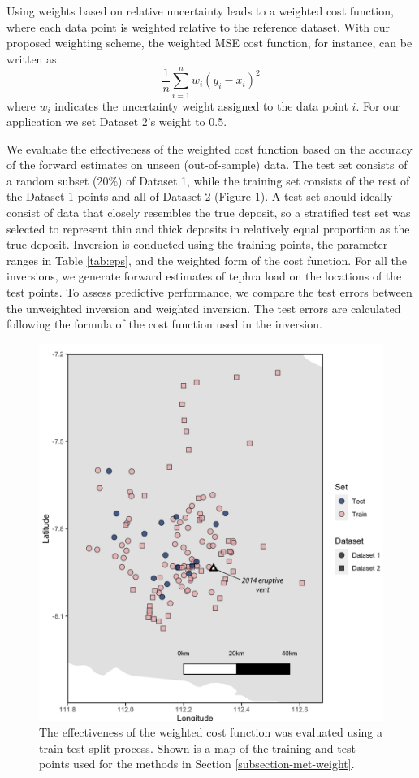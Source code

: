 \documentclass[a4paper,fleqn]{cas-sc}
\begin{document}
Using weights based on relative uncertainty leads to a weighted cost function, where each data point is weighted relative to the reference dataset. With our proposed weighting scheme, the weighted MSE cost function, for instance, can be written as:
\begin{equation}
\frac{1}{n} \sum_{i=1}^{n} w_{i} (y_{i} - x_{i})^{2}
\end{equation}
where $w_{i}$ indicates the uncertainty weight assigned to the data point $i$. For our application we set Dataset 2's weight to 0.5. 

We evaluate the effectiveness of the weighted cost function based on the accuracy of the forward estimates on unseen (out-of-sample) data. The test set consists of a random subset (20\%) of Dataset 1, while the training set consists of the rest of the Dataset 1 points and all of Dataset 2 (Figure \ref{fig:train-test}). A test set should ideally consist of data that closely resembles the true deposit, so a stratified test set was selected to represent thin and thick deposits in relatively equal proportion as the true deposit. Inversion is conducted using the training points, the parameter ranges in Table \ref{tab:eps}, and the weighted form of the cost function. For all the inversions, we generate forward estimates of tephra load on the locations of the test points. To assess predictive performance, we compare the test errors between the unweighted inversion and weighted inversion. The test errors are calculated following the formula of the cost function used in the inversion.

    \begin{figure}[htbp]
    \centering
    \includegraphics[width=0.8\linewidth]{Figures/fig4_train-test.png}
    \caption{The effectiveness of the weighted cost function was evaluated using a train-test split process. Shown is a map of the training and test points used for the methods in Section \ref{subsection-met-weight}.}
    \label{fig:train-test}
    \end{figure}
\end{document}
